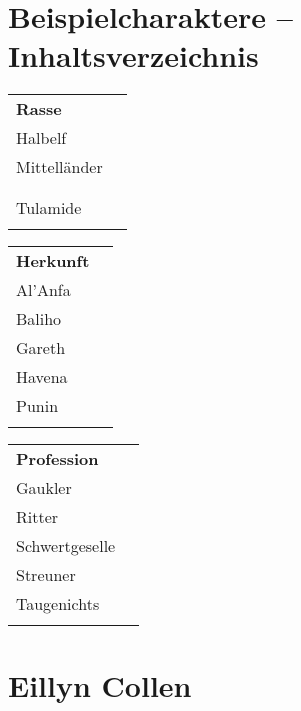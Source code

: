 \newpage\section*{Beispielcharaktere -- Inhaltsverzeichnis}
\noindent\begin{footnotesize}
%
%
\begin{tabularx}{0.30\textwidth}[t]{|lR|}
\bf Rasse & \bf {} \\
Halbelf
			& \pageref{GauklerGareth} \\
Mittelländer 
			& \pageref{SchwertgeselleHavena} \\
			& \pageref{TaugenichtsPunin} \\
			& \pageref{RitterBaliho} \\
Tulamide 
			& \pageref{StreunerAlAnfa} \\
\end{tabularx}
%
%
\hfill
%
%
\begin{tabularx}{0.30\textwidth}[t]{|lR|}
\bf Herkunft & \bf {} \\
Al'Anfa     & \pageref{StreunerAlAnfa} \\
Baliho      & \pageref{RitterBaliho} \\
Gareth      & \pageref{GauklerGareth} \\
Havena      & \pageref{SchwertgeselleHavena} \\
Punin       & \pageref{TaugenichtsPunin} \\
\end{tabularx}
%
%
\hfill
%
%
\begin{tabularx}{0.30\textwidth}[t]{|lR|}
\bf Profession & \bf {} \\
Gaukler & \pageref{GauklerGareth} \\
Ritter & \pageref{RitterBaliho} \\
Schwertgeselle & \pageref{SchwertgeselleHavena} \\
Streuner     & \pageref{StreunerAlAnfa} \\
Taugenichts & \pageref{TaugenichtsPunin} \\
\end{tabularx}
%
%
\end{footnotesize}

\newpage\section{Eillyn Collen}\label{SchwertgeselleHavena}
